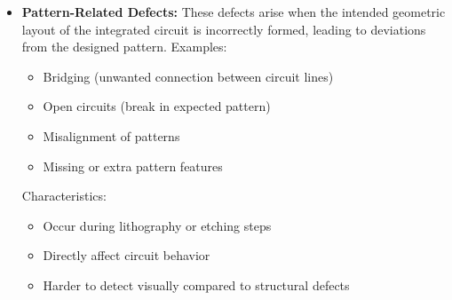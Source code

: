 \begin{itemize}
        \item \textbf{Pattern-Related Defects:}
        These defects arise when the intended geometric layout of the integrated circuit is incorrectly formed, leading to deviations from the designed pattern.
        Examples:
    \begin{itemize}
        \item Bridging (unwanted connection between circuit lines)
        \item Open circuits (break in expected pattern)
        \item Misalignment of patterns
        \item Missing or extra pattern features
    \end{itemize}
    Characteristics:
        \begin{itemize}
            \item Occur during lithography or etching steps
            \item Directly affect circuit behavior
            \item Harder to detect visually compared to structural defects
        \end{itemize}
\end{itemize}

